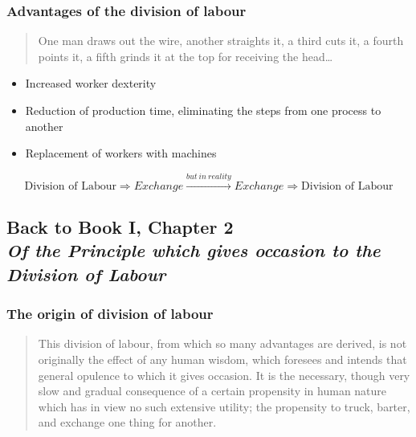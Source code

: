         \subsubsection{Advantages of the division of labour}

            \begin{quote}
                One man draws out the wire, another straights it, a third cuts it, a fourth points it, a fifth grinds it at the top for receiving the head…
            \end{quote}

            \begin{itemize}
                \item Increased worker dexterity
                \item Reduction of production time, eliminating the steps from one process to another
                \item Replacement of workers with machines
            \end{itemize}

            \begin{equation}
                \text{Division of Labour} \Rightarrow Exchange \xrightarrow{but \ in \ reality}{} Exchange \Rightarrow \text{Division of Labour}
            \end{equation}

    \subsection[Back to "Of the Principle which gives occasion to the Division of Labour"]{Back to Book I, Chapter 2 \\
                \textit{Of the Principle which gives occasion to the Division of Labour}}

        \subsubsection{The origin of division of labour}

            \begin{quote}
                This division of labour, from which so many advantages are derived, is not originally the effect of any human wisdom, which foresees and intends that general opulence to which it gives occasion. It is the necessary, though very slow and gradual consequence of a certain propensity in human nature which has in view no such extensive utility; the propensity to truck, barter, and exchange one thing for another.
            \end{quote}

